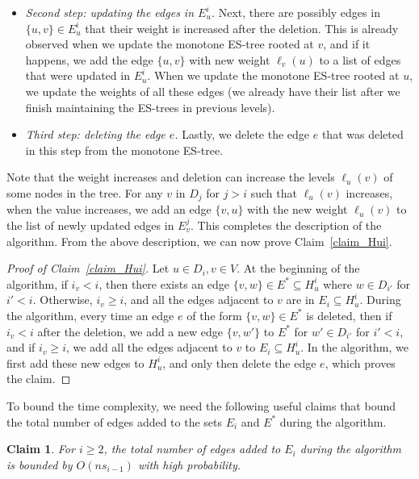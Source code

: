 \documentclass[11pt]{article}
\newtheorem{claim}[theorem]{Claim}
\theoremstyle{definition}
\theoremstyle{remark}
\begin{document}
\begin{titlepage}
\begin{itemize}
    \item \textit{Second step: updating the edges in $E_u^i$.} Next, there are possibly edges in $\{u,v\} \in E_u^i$ that their weight is increased after the deletion. This is already observed when we update the monotone ES-tree rooted at $v$, and if it happens, we add the edge $\{u,v\}$ with new weight $\ell_v(u)$ to a list of edges that were updated in $E_u^i$. When we update the monotone ES-tree rooted at $u$, we update the weights of all these edges (we already have their list after we finish maintaining the ES-trees in previous levels).
    \item \textit{Third step: deleting the edge $e$.} Lastly, we delete the edge $e$ that was deleted in this step from the monotone ES-tree. 
\end{itemize}

Note that the weight increases and deletion can increase the levels $\ell_u(v)$ of some nodes in the tree. For any $v$ in $D_j$ for $j > i$ such that $\ell_u(v)$ increases, when the value increases, we add an edge $\{v,u\}$ with the new weight $\ell_u(v)$ to the list of newly updated edges in $E_v^j$. This completes the description of the algorithm.
From the above description, we can now prove Claim~\ref{claim_Hui}. 

\begin{proof}[Proof of Claim~\ref{claim_Hui}]
Let $u \in D_i, v \in V$. At the beginning of the algorithm, if $i_v < i$, then there exists an edge $\{v,w\} \in E^* \subseteq H_u^i$ where $w \in D_{i'}$ for $i' < i$. Otherwise, $i_v \geq i$, and all the edges adjacent to $v$ are in $E_i \subseteq H_u^i$. During the algorithm, every time an edge $e$ of the form $\{v,w\} \in E^*$ is deleted, then if $i_v < i$ after the deletion, we add a new edge $\{v,w'\}$ to $E^*$ for $w' \in D_{i'}$ for $i' < i$, and if $i_v \geq i$, we add all the edges adjacent to $v$ to $E_i \subseteq H_u^i$. In the algorithm, we first add these new edges to $H_u^i$, and only then delete the edge $e$, which proves the claim.
\end{proof}

To bound the time complexity, we need the following useful claims that bound the total number of edges added to the sets $E_i$ and $E^*$ during the algorithm.

\begin{claim}\label{claim_Ei}
For $i \geq 2$, the total number of edges added to $E_i$ during the algorithm is bounded by $O(ns_{i-1})$ with high probability.
\end{claim}


\end{titlepage}
\end{document}
